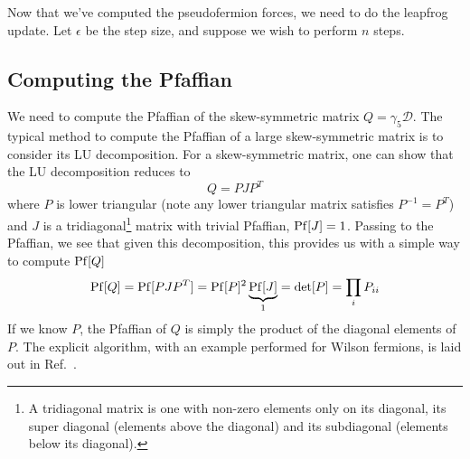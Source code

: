 Now that we've computed the pseudofermion forces, we need to do the leapfrog update. Let $\epsilon$ be the step size, and suppose we wish to perform $n$ steps. 

\subsection{Computing the Pfaffian}

We need to compute the Pfaffian of the skew-symmetric matrix $Q = \gamma_5\mathcal D$. The typical method to compute the Pfaffian of a large skew-symmetric matrix is to consider its LU decomposition. For a skew-symmetric matrix, one can show that the LU decomposition reduces to
\begin{equation}
	Q = P J P^T
\end{equation}
where $P$ is lower triangular (note any lower triangular matrix satisfies $P^{-1} = P^T$) and $J$ is a tridiagonal\footnote{A tridiagonal matrix is one with non-zero elements only on its diagonal, its super diagonal (elements above the diagonal) and its subdiagonal (elements below its diagonal).} matrix with trivial Pfaffian, $\mathrm{Pf} [J] = 1$. Passing to the Pfaffian, we see that given this decomposition, this provides us with a simple way to compute $\mathrm{Pf} [Q]$
\begin{equation}
	\mathrm{Pf} [Q] = \mathrm{Pf} [PJP^T] = \mathrm{Pf} [P]^2 \underbrace{\mathrm{Pf}[J]}_{1} = \det [P] = \prod_i P_{ii}
\end{equation}
If we know $P$, the Pfaffian of $Q$ is simply the product of the diagonal elements of $P$. The explicit algorithm, with an example performed for Wilson fermions, is laid out in Ref.~\cite{Rubow:2011dq}. 

